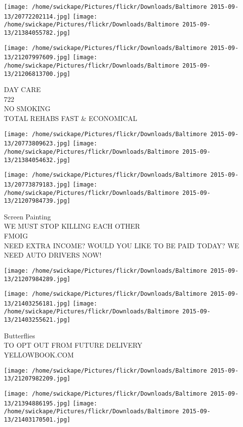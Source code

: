\documentclass[10pt,letterpaper]{article}
\begin{document}
\texttt{[image: /home/swickape/Pictures/flickr/Downloads/Baltimore 2015-09-13/20772202114.jpg]}
\texttt{[image: /home/swickape/Pictures/flickr/Downloads/Baltimore 2015-09-13/21384055782.jpg]}

\texttt{[image: /home/swickape/Pictures/flickr/Downloads/Baltimore 2015-09-13/21207997609.jpg]}
\texttt{[image: /home/swickape/Pictures/flickr/Downloads/Baltimore 2015-09-13/21206813700.jpg]}

DAY CARE\\
722\\
NO SMOKING\\
TOTAL REHABS FAST \& ECONOMICAL\\
\pagebreak

\texttt{[image: /home/swickape/Pictures/flickr/Downloads/Baltimore 2015-09-13/20773809623.jpg]}
\texttt{[image: /home/swickape/Pictures/flickr/Downloads/Baltimore 2015-09-13/21384054632.jpg]}

\texttt{[image: /home/swickape/Pictures/flickr/Downloads/Baltimore 2015-09-13/20773879183.jpg]}
\texttt{[image: /home/swickape/Pictures/flickr/Downloads/Baltimore 2015-09-13/21207984739.jpg]}

Screen Painting\\
WE MUST STOP KILLING EACH OTHER\\
FMOIG\\
NEED EXTRA INCOME?  WOULD YOU LIKE TO BE PAID TODAY?  WE NEED AUTO DRIVERS NOW!\\
\pagebreak

\texttt{[image: /home/swickape/Pictures/flickr/Downloads/Baltimore 2015-09-13/21207984289.jpg]}

\vspace{0.25in}
\texttt{[image: /home/swickape/Pictures/flickr/Downloads/Baltimore 2015-09-13/21403256181.jpg]}
\texttt{[image: /home/swickape/Pictures/flickr/Downloads/Baltimore 2015-09-13/21403255621.jpg]}

Butterflies\\
TO OPT OUT FROM FUTURE DELIVERY\\
YELLOWBOOK.COM\\
\pagebreak

\texttt{[image: /home/swickape/Pictures/flickr/Downloads/Baltimore 2015-09-13/21207982209.jpg]}

\vspace{0.25in}
\texttt{[image: /home/swickape/Pictures/flickr/Downloads/Baltimore 2015-09-13/21394886195.jpg]}
\texttt{[image: /home/swickape/Pictures/flickr/Downloads/Baltimore 2015-09-13/21403170501.jpg]}
\end{document}
